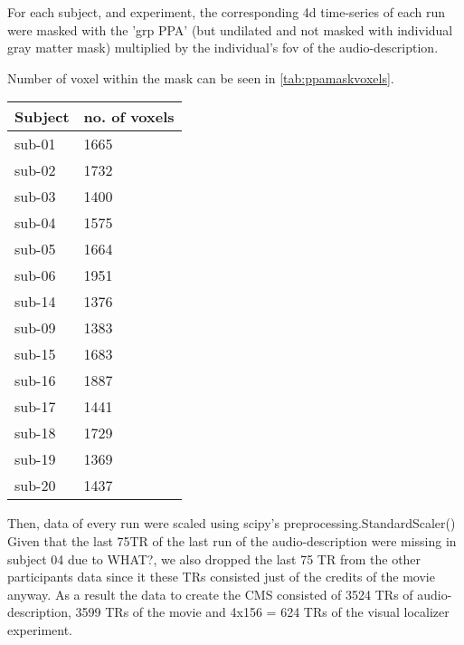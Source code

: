 


For each subject, and experiment, the corresponding 4d time-series of each run
were masked with the 'grp PPA' (but undilated and not masked with individual
gray matter mask) multiplied by the individual's \ac{fov} of the
audio-description.

%
Number of voxel within the mask can be seen in \ref{tab:ppamaskvoxels}.

\begin{table*}[btp]
\caption{Number of voxels within the union of individual PPAs projected back
    into individuals' subject-space.}
\label{tab:ppamaskvoxels}
\begin{tabular}{ll}
\toprule
\textbf{Subject} & \textbf{no. of voxels} \\
\midrule
sub-01 & 1665 \tabularnewline
sub-02 & 1732 \tabularnewline
sub-03 & 1400 \tabularnewline
sub-04 & 1575 \tabularnewline
sub-05 & 1664 \tabularnewline
sub-06 & 1951 \tabularnewline
sub-14 & 1376 \tabularnewline
sub-09 & 1383 \tabularnewline
sub-15 & 1683 \tabularnewline
sub-16 & 1887 \tabularnewline
sub-17 & 1441 \tabularnewline
sub-18 & 1729 \tabularnewline
sub-19 & 1369 \tabularnewline
sub-20 & 1437 \tabularnewline
\bottomrule
\end{tabular}
\end{table*}

Then, data of every run were scaled using scipy's preprocessing.StandardScaler()
Given that the last 75TR of the last run of the audio-description were missing
in subject 04 due to WHAT?, we also dropped the last 75 TR from the other
participants data since it these TRs consisted just of the credits of the movie
anyway.
As a result the data to create the CMS consisted of 3524 TRs of
audio-description, 3599 TRs of the movie and 4x156 = 624 TRs of the visual
localizer experiment.

